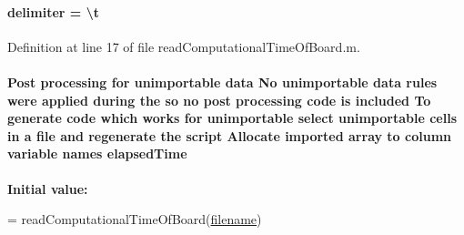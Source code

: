\hypertarget{a00114_aacf4e58be14eef37272a71c004bc3f58}{}
\paragraph[{delimiter}]{\setlength{\rightskip}{0pt plus 5cm}delimiter = \textquotesingle{}\textbackslash{}{\bf t}\textquotesingle{}}\label{a00114_aacf4e58be14eef37272a71c004bc3f58}


Definition at line 17 of file read\+Computational\+Time\+Of\+Board.\+m.

\hypertarget{a00114_ab95225146f45d9e8e1089618cf68c6e1}{}
\paragraph[{elapsed\+Time}]{\setlength{\rightskip}{0pt plus 5cm}Post processing for unimportable {\bf data} No unimportable {\bf data} rules were applied during the so no post processing code is included To generate code which works for unimportable select unimportable cells in a {\bf file} and regenerate the script Allocate imported array to column variable names elapsed\+Time}\label{a00114_ab95225146f45d9e8e1089618cf68c6e1}
{\bfseries Initial value\+:}
\begin{DoxyCode}
= readComputationalTimeOfBoard(\hyperlink{a00099_a2ff994e16bf9521154de4cf659a3b689}{filename})
%
%
\end{DoxyCode}


